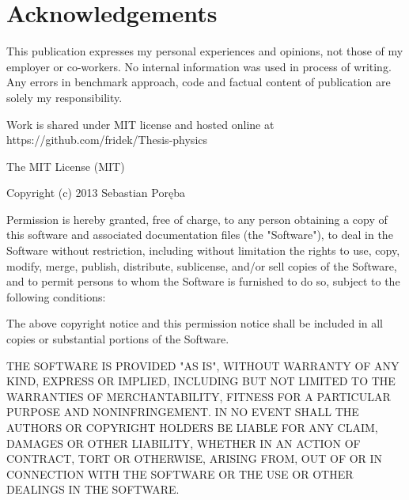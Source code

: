 \chapter{Acknowledgements}
\label{cha:acknowledgements}

This publication expresses my personal experiences and opinions, not those of my employer or co-workers. No internal information was used in process of writing. Any errors in benchmark approach, code and factual content of publication are solely my responsibility.

Work is shared under MIT license and hosted online at https://github.com/fridek/Thesis-physics

The MIT License (MIT)

Copyright (c) 2013 Sebastian Poręba

Permission is hereby granted, free of charge, to any person obtaining a copy of
this software and associated documentation files (the "Software"), to deal in
the Software without restriction, including without limitation the rights to
use, copy, modify, merge, publish, distribute, sublicense, and/or sell copies of
the Software, and to permit persons to whom the Software is furnished to do so,
subject to the following conditions:

The above copyright notice and this permission notice shall be included in all
copies or substantial portions of the Software.

THE SOFTWARE IS PROVIDED "AS IS", WITHOUT WARRANTY OF ANY KIND, EXPRESS OR
IMPLIED, INCLUDING BUT NOT LIMITED TO THE WARRANTIES OF MERCHANTABILITY, FITNESS
FOR A PARTICULAR PURPOSE AND NONINFRINGEMENT. IN NO EVENT SHALL THE AUTHORS OR
COPYRIGHT HOLDERS BE LIABLE FOR ANY CLAIM, DAMAGES OR OTHER LIABILITY, WHETHER
IN AN ACTION OF CONTRACT, TORT OR OTHERWISE, ARISING FROM, OUT OF OR IN
CONNECTION WITH THE SOFTWARE OR THE USE OR OTHER DEALINGS IN THE SOFTWARE.
